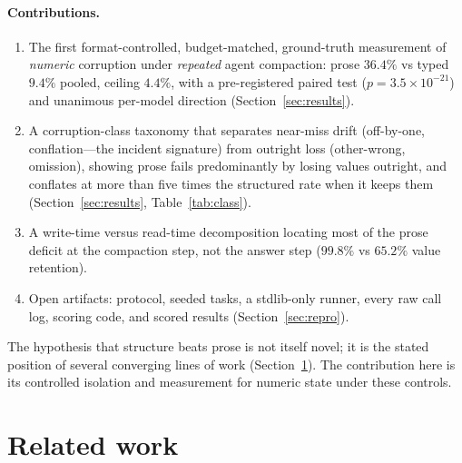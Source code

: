 \documentclass[11pt]{article}
\begin{document}
\paragraph{Contributions.}
\begin{enumerate}
  \item The first format-controlled, budget-matched, ground-truth measurement
  of \emph{numeric} corruption under \emph{repeated} agent compaction: prose
  $36.4\%$ vs typed $9.4\%$ pooled, ceiling $4.4\%$, with a pre-registered
  paired test ($p=3.5\times10^{-21}$) and unanimous per-model direction
  (Section~\ref{sec:results}).
  \item A corruption-class taxonomy that separates near-miss drift
  (off-by-one, conflation---the incident signature) from outright loss
  (other-wrong, omission), showing prose fails predominantly by losing values
  outright, and conflates at more than five times the structured rate when it
  keeps them (Section~\ref{sec:results}, Table~\ref{tab:class}).
  \item A write-time versus read-time decomposition locating most of the prose
  deficit at the compaction step, not the answer step ($99.8\%$ vs $65.2\%$
  value retention).
  \item Open artifacts: protocol, seeded tasks, a stdlib-only runner, every
  raw call log, scoring code, and scored results
  (Section~\ref{sec:repro}).
\end{enumerate}

The hypothesis that structure beats prose is not itself novel; it is the
stated position of several converging lines of work
(Section~\ref{sec:rw}). The contribution here is its controlled isolation and
measurement for numeric state under these controls.

\section{Related work}
\label{sec:rw}
\end{document}
